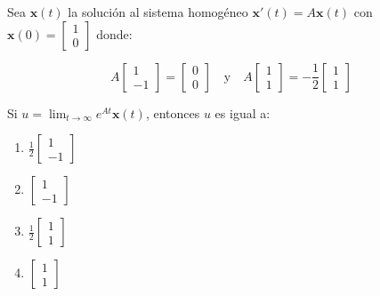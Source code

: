 \begin{ejercicio}[title=Comportamiento Asintótico de Sistemas Lineales]
Sea $\mathbf{x}(t)$ la solución al sistema homogéneo $\mathbf{x}'(t) = A\mathbf{x}(t)$ con $\mathbf{x}(0) = \begin{bmatrix}1\\0\end{bmatrix}$ donde:

$$A\begin{bmatrix}1\\-1\end{bmatrix} = \begin{bmatrix}0\\0\end{bmatrix} \quad \text{y} \quad A\begin{bmatrix}1\\1\end{bmatrix} = -\frac{1}{2}\begin{bmatrix}1\\1\end{bmatrix}$$

Si $u = \lim_{t\to\infty} e^{At}\mathbf{x}(t)$, entonces $u$ es igual a:

\begin{enumerate}[label=\alph*)]
    \item $\displaystyle \frac{1}{2}\begin{bmatrix}1\\-1\end{bmatrix}$
    
    \item $\displaystyle \begin{bmatrix}1\\-1\end{bmatrix}$
    
    \item $\displaystyle \frac{1}{2}\begin{bmatrix}1\\1\end{bmatrix}$
    
    \item $\displaystyle \begin{bmatrix}1\\1\end{bmatrix}$
\end{enumerate}
\end{ejercicio}

